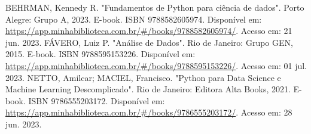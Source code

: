 \documentclass[conference]{IEEEtran}
\begin{document}
\begin{thebibliography}{00}
 BEHRMAN, Kennedy R. "Fundamentos de Python para ciência de dados". Porto Alegre: Grupo A, 2023. E-book. ISBN 9788582605974. Disponível em: \url{https://app.minhabiblioteca.com.br/#/books/9788582605974/}. Acesso em: 21 jun. 2023.
 FÁVERO, Luiz P. "Análise de Dados". Rio de Janeiro: Grupo GEN, 2015. E-book. ISBN 9788595153226. Disponível em: \url{https://app.minhabiblioteca.com.br/#/books/9788595153226/}. Acesso em: 01 jul. 2023.
 NETTO, Amilcar; MACIEL, Francisco. "Python para Data Science e Machine Learning Descomplicado". Rio de Janeiro: Editora Alta Books, 2021. E-book. ISBN 9786555203172. Disponível em: \url{https://app.minhabiblioteca.com.br/#/books/9786555203172/}. Acesso em: 28 jun. 2023.
\end{thebibliography}
\vspace{12pt}
\end{document}
